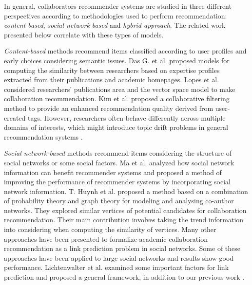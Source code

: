 \documentclass[10pt]{article}
\begin{document}
In general, collaborators recommender systems are studied in three different perspectives according to methodologies used to perform recommendation: \emph{content-based}, \emph{social network-based} and \emph{hybrid approach}. The related work presented below correlate with these types of models.

\emph{Content-based} methods recommend items classified according to user profiles and early choices considering semantic issues. Das G. et al. \cite{gollapalli2012similar} proposed models for computing the similarity between researchers based on expertise profiles extracted from their publications and academic homepages. Lopes et al. \cite{lopes2010collaboration} considered researchers' publications area and the vector space model to make collaboration recommendation. Kim et al. \cite{kim2010collaborative} proposed a collaborative filtering method to provide an enhanced recommendation quality derived from user-created tags. However, researchers often behave differently across multiple domains of interests, which might introduce topic drift problems in general recommendation systems \cite{tang2012cross}.

\emph{Social network-based} methods recommend items considering the structure of social networks or some social factors. Ma et al. \cite{ma2011recommender} analyzed how social network information can benefit recommender systems and proposed a method of improving the performance of recommender systems by incorporating social network information. T. Huynh et al. \cite{huynh2013trend} proposed a method based on a combination of probability theory and graph theory for modeling and analysing co-author networks. They explored similar vertices of potential candidates for collaboration recommendation. Their main contribution involves taking the trend information into considering when computing the similarity of vertices. Many other approaches \cite{chen2012discovering,sun2011co} have been presented to formalize academic collaboration recommendation as a link prediction problem in social networks. Some of these approaches have been applied to large social networks and results show good performance. Lichtenwalter et al. \cite{lichtenwalter2010new} examined some important factors for link prediction and proposed a general framework, in addition to our previous work \cite{li2014acrec,xia2014mvcwalker}.
\end{document}
